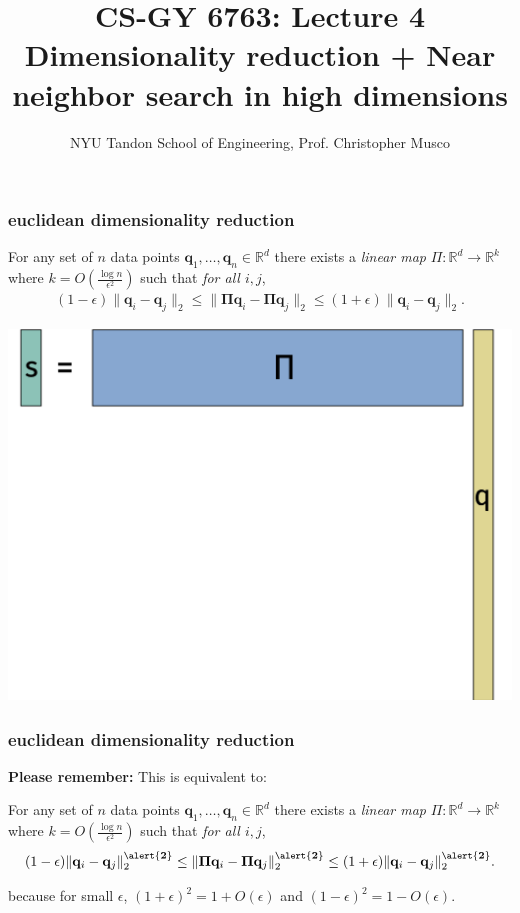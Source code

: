 \documentclass[compress]{beamer}
\title{CS-GY 6763: Lecture 4 \\ Dimensionality reduction + Near neighbor search in high dimensions}
\author{NYU Tandon School of Engineering, Prof. Christopher Musco}
\date{}
\newcommand{\bs}[1]{\boldsymbol{#1}}
\newcommand{\bv}[1]{\mathbf{#1}}
\newcommand{\R}{\mathbb{R}}
\begin{document}
\begin{frame}
	\titlepage 
\end{frame}


\begin{frame}
	\frametitle{euclidean dimensionality reduction}
	\begin{lemma}
		For any set of $n$ data points $\bv{q}_1,\ldots, \bv{q}_n \in \R^d$ there exists a \emph{linear map} $\Pi: \R^d \rightarrow \R^k$ where $k = O\left(\frac{\log n}{\epsilon^2}\right)$ such that \emph{for all $i,j$},
		\begin{align*}
			(1-\epsilon)\|\bv{q}_i - \bv{q}_j\|_2 \leq \|\bs{\Pi}\bv{q}_i - \bs{\Pi}\bv{q}_j\|_2 \leq (1+\epsilon)\|\bv{q}_i - \bv{q}_j\|_2.
		\end{align*}
	\end{lemma}
	\begin{center}
		\includegraphics[height=.45\textheight]{jl_sketch.png}
	\end{center}
\end{frame}

\begin{frame}
	\frametitle{euclidean dimensionality reduction}
	\textbf{Please remember:} This is equivalent to: 
	\begin{lemma}
		For any set of $n$ data points $\bv{q}_1,\ldots, \bv{q}_n \in \R^d$ there exists a \emph{linear map} $\Pi: \R^d \rightarrow \R^k$ where $k = O\left(\frac{\log n}{\epsilon^2}\right)$ such that \emph{for all $i,j$},
		\begin{align*}
			(1-\epsilon)\|\bv{q}_i - \bv{q}_j\|_2^{\mathbf{\alert{2}}} \leq \|\bs{\Pi}\bv{q}_i - \bs{\Pi}\bv{q}_j\|_2^{\mathbf{\alert{2}}} \leq (1+\epsilon)\|\bv{q}_i - \bv{q}_j\|_2^{\mathbf{\alert{2}}}.
		\end{align*}
	\end{lemma}
	because for small $\epsilon$, $(1+\epsilon)^2 = 1 + O(\epsilon)$ and $(1-\epsilon)^2 = 1 - O(\epsilon)$.
\end{frame}
\end{document}
